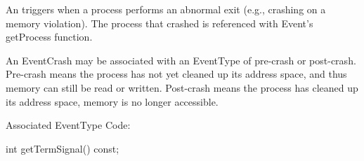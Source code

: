 
An  triggers when a process performs an abnormal exit (e.g.,
crashing on a memory violation). The process that crashed is referenced with
Event's getProcess function.

An EventCrash may be associated with an EventType of pre-crash or post-crash.
Pre-crash means the process has not yet cleaned up its address space, and thus
memory can still be read or written. Post-crash means the process has cleaned up
its address space, memory is no longer accessible.

Associated EventType Code: 

\begin{apient}
int getTermSignal() const;
\end{apient}

